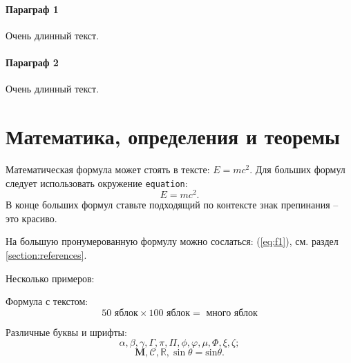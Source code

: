 \documentclass[a4paper, 14pt]{extreport}
\begin{document}
\paragraph{Параграф 1} 

Очень длинный текст.

\paragraph{Параграф 2} Очень длинный текст.




\section{Математика, определения и теоремы}

Математическая формула может стоять в тексте: $E = mc^2$. Для больших формул следует использовать окружение \verb!equation!:
\begin{equation}\label{eq:f1}
    E = mc^2.
\end{equation}
В конце больших формул ставьте подходящий по контексте знак препинания -- это красиво.

На большую пронумерованную формулу можно сослаться: (\ref{eq:f1}), см. раздел \ref{section:references}.

Несколько примеров:

Формула с текстом:
\begin{equation}
    50 \text{ яблок} \times 100 \text{ яблок} =
    \textbf{ много яблок}
\end{equation}

Различные буквы и шрифты:
\begin{equation}
    \alpha,  \beta,  \gamma, \Gamma, \pi, \Pi, \phi, \varphi, \mu, \Phi, \xi, \zeta;
\end{equation}
\begin{equation}
    \mathbf M, \mathcal C, \mathbb R, \sin \theta = \mathrm{sin} \theta.
\end{equation}
\end{document}
